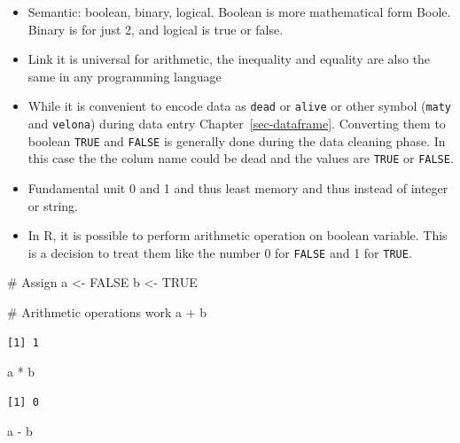 \documentclass[
  letterpaper,
  DIV=11,
  numbers=noendperiod]{scrreprt}
\newenvironment{Shaded}{\begin{snugshade}}{\end{snugshade}}
\newcommand{\CommentTok}[1]{\textcolor[rgb]{0.37,0.37,0.37}{#1}}
\newcommand{\ConstantTok}[1]{\textcolor[rgb]{0.56,0.35,0.01}{#1}}
\newcommand{\NormalTok}[1]{\textcolor[rgb]{0.00,0.23,0.31}{#1}}
\newcommand{\OtherTok}[1]{\textcolor[rgb]{0.00,0.23,0.31}{#1}}
\newcommand{\SpecialCharTok}[1]{\textcolor[rgb]{0.37,0.37,0.37}{#1}}
\begin{document}
\begin{itemize}
\item
  Semantic: boolean, binary, logical. Boolean is more mathematical form
  Boole. Binary is for just 2, and logical is true or false.
\item
  Link it is universal for arithmetic, the inequality and equality are
  also the same in any programming language
\item
  While it is convenient to encode data as \texttt{dead} or
  \texttt{alive} or other symbol (\texttt{maty} and \texttt{velona})
  during data entry Chapter~\ref{sec-dataframe}. Converting them to
  boolean \texttt{TRUE} and \texttt{FALSE} is generally done during the
  data cleaning phase. In this case the the colum name could be dead and
  the values are \texttt{TRUE} or \texttt{FALSE}.
\item
  Fundamental unit 0 and 1 and thus least memory and thus instead of
  integer or string.
\item
  In R, it is possible to perform arithmetic operation on boolean
  variable. This is a decision to treat them like the number 0 for
  \texttt{FALSE} and 1 for \texttt{TRUE}.
\end{itemize}

\begin{Shaded}
\begin{Highlighting}[]
\CommentTok{\# Assign}
\NormalTok{a }\OtherTok{\textless{}{-}} \ConstantTok{FALSE}
\NormalTok{b }\OtherTok{\textless{}{-}} \ConstantTok{TRUE}

\CommentTok{\# Arithmetic operations work}
\NormalTok{a }\SpecialCharTok{+}\NormalTok{ b}
\end{Highlighting}
\end{Shaded}

\begin{verbatim}
[1] 1
\end{verbatim}

\begin{Shaded}
\begin{Highlighting}[]
\NormalTok{a }\SpecialCharTok{*}\NormalTok{ b}
\end{Highlighting}
\end{Shaded}

\begin{verbatim}
[1] 0
\end{verbatim}

\begin{Shaded}
\begin{Highlighting}[]
\NormalTok{a }\SpecialCharTok{{-}}\NormalTok{ b}
\end{Highlighting}
\end{Shaded}
\end{document}
